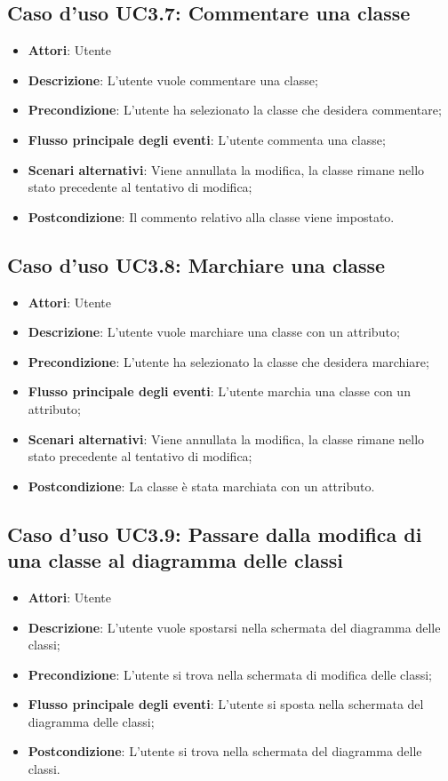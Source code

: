 \documentclass[../AnalisiDeiRequisiti.tex]{subfiles}
\begin{document}
			\subsection{Caso d'uso UC3.7: Commentare una classe}
			\begin{itemize}
				\item \textbf{Attori}: Utente
				\item \textbf{Descrizione}: L'utente vuole commentare una classe;
				\item \textbf{Precondizione}: L'utente ha selezionato la classe che desidera commentare;
				\item \textbf{Flusso principale degli eventi}: L'utente commenta una classe;
				\item \textbf{Scenari alternativi}: Viene annullata la modifica, la classe rimane nello stato precedente al tentativo di modifica;
				\item \textbf{Postcondizione}: Il commento relativo alla classe viene impostato.
			\end{itemize}
			\subsection{Caso d'uso UC3.8: Marchiare una classe}
			\begin{itemize}
				\item \textbf{Attori}: Utente
				\item \textbf{Descrizione}: L'utente vuole marchiare una classe con un attributo;
				\item \textbf{Precondizione}: L'utente ha selezionato la classe che desidera marchiare;
				\item \textbf{Flusso principale degli eventi}: L'utente marchia una classe con un attributo;
				\item \textbf{Scenari alternativi}: Viene annullata la modifica, la classe rimane nello stato precedente al tentativo di modifica;
				\item \textbf{Postcondizione}: La classe è stata marchiata con un attributo.
			\end{itemize}
			\subsection{Caso d'uso UC3.9: Passare dalla modifica di una classe al diagramma delle classi}
			\begin{itemize}
				\item \textbf{Attori}: Utente
				\item \textbf{Descrizione}: L'utente vuole spostarsi nella schermata del diagramma delle classi;
				\item \textbf{Precondizione}: L'utente si trova nella schermata di modifica delle classi;
				\item \textbf{Flusso principale degli eventi}: L'utente si sposta nella schermata del diagramma delle classi;
				\item \textbf{Postcondizione}: L'utente si trova nella schermata del diagramma delle classi.
			\end{itemize}
\end{document}
